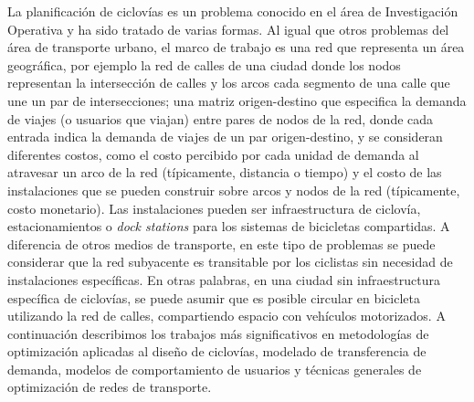   La planificación de ciclovías es un problema conocido en el área de Investigación Operativa y ha sido tratado de varias formas. Al igual que otros problemas del área de transporte urbano, el marco de trabajo es una red que representa un área geográfica, por ejemplo la red de calles de una ciudad donde los nodos representan la intersección de calles y los arcos cada segmento de una calle que une un par de intersecciones; una matriz origen-destino que especifica la demanda de viajes (o usuarios que viajan) entre pares de nodos de la red, donde cada entrada indica la demanda de viajes de un par origen-destino, y se consideran diferentes costos, como el costo percibido por cada unidad de demanda al atravesar un arco de la red (típicamente, distancia o tiempo) y el costo de las instalaciones que se pueden construir sobre arcos y nodos de la red (típicamente, costo monetario). Las instalaciones pueden ser infraestructura de ciclovía, estacionamientos o {\it dock stations} para los sistemas de bicicletas compartidas. A diferencia de otros medios de transporte, en este tipo de problemas se puede considerar que la red subyacente es transitable por los ciclistas sin necesidad de instalaciones específicas. En otras palabras, en una ciudad sin infraestructura específica de ciclovías, se puede asumir que es posible circular en bicicleta utilizando la red de calles, compartiendo espacio con vehículos motorizados. A continuación describimos los trabajos más significativos en metodologías de optimización aplicadas al diseño de ciclovías, modelado de transferencia de demanda, modelos de comportamiento de usuarios y técnicas generales de optimización de redes de transporte.

